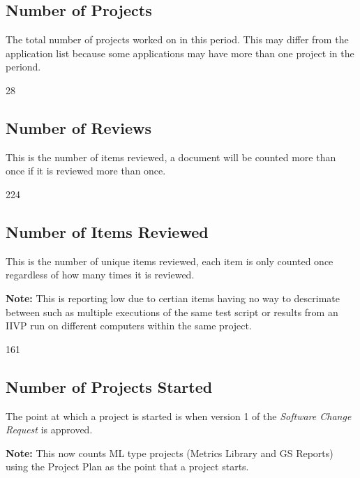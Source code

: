 \documentclass{article}
\begin{document}
\subsection{Number of Projects}
The total number of  projects worked on in this period. This may differ from the
application list because some applications may have more than one project in
the periond.

\begin{Schunk}
\begin{Soutput}
[1] 28
\end{Soutput}
\end{Schunk}

\subsection{Number of Reviews}
This is the number of items reviewed, a document will be counted more than once
if it is reviewed more than once.

\begin{Schunk}
\begin{Soutput}
[1] 224
\end{Soutput}
\end{Schunk}

\subsection{Number of Items Reviewed}
This is the number of unique items reviewed, each item is only counted once
regardless of how many times it is reviewed.

\textbf{Note:} This is reporting low due to certian items having no way to
descrimate between such as multiple executions of the same test script or
results from an IIVP run on different computers within the same project.

\begin{Schunk}
\begin{Soutput}
[1] 161
\end{Soutput}
\end{Schunk}

\subsection{Number of Projects Started}
The point at which a project is started is when version 1 of the \textit{Software
Change Request} is approved.

\textbf{Note:} This now counts ML type projects (Metrics Library and GS Reports)
using the Project Plan as the point that a project starts.
\end{document}
